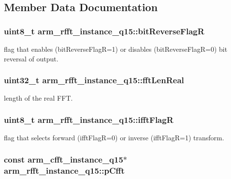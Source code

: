 \subsection{Member Data Documentation}
\hypertarget{structarm__rfft__instance__q15_a4c65cd40e0098ec2f5c0dc31488b9bc6}{
\subsubsection[{bit\-Reverse\-Flag\-R}]{\setlength{\rightskip}{0pt plus 5cm}uint8\-\_\-t arm\-\_\-rfft\-\_\-instance\-\_\-q15\-::bit\-Reverse\-Flag\-R}}\label{structarm__rfft__instance__q15_a4c65cd40e0098ec2f5c0dc31488b9bc6}
flag that enables (bit\-Reverse\-Flag\-R=1) or disables (bit\-Reverse\-Flag\-R=0) bit reversal of output. \hypertarget{structarm__rfft__instance__q15_aac5cf9e825917cbb14f439e56bb86ab3}{
\subsubsection[{fft\-Len\-Real}]{\setlength{\rightskip}{0pt plus 5cm}uint32\-\_\-t arm\-\_\-rfft\-\_\-instance\-\_\-q15\-::fft\-Len\-Real}}\label{structarm__rfft__instance__q15_aac5cf9e825917cbb14f439e56bb86ab3}
length of the real F\-F\-T. \hypertarget{structarm__rfft__instance__q15_a8051ffe268c147e431e1bea7bb4c4258}{
\subsubsection[{ifft\-Flag\-R}]{\setlength{\rightskip}{0pt plus 5cm}uint8\-\_\-t arm\-\_\-rfft\-\_\-instance\-\_\-q15\-::ifft\-Flag\-R}}\label{structarm__rfft__instance__q15_a8051ffe268c147e431e1bea7bb4c4258}
flag that selects forward (ifft\-Flag\-R=0) or inverse (ifft\-Flag\-R=1) transform. \hypertarget{structarm__rfft__instance__q15_a4329c15b056444746d37ff082a24d31a}{
\subsubsection[{p\-Cfft}]{\setlength{\rightskip}{0pt plus 5cm}const {\bf arm\-\_\-cfft\-\_\-instance\-\_\-q15}$\ast$ arm\-\_\-rfft\-\_\-instance\-\_\-q15\-::p\-Cfft}}\label{structarm__rfft__instance__q15_a4329c15b056444746d37ff082a24d31a}
